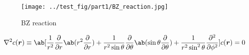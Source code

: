 \documentclass[autodetect-engine,dvipdfmx-if-dvi,a4paper,ja=standard]{bxjsbook}
\begin{document}
\begin{figure}
  \centering
  \texttt{[image: ../test\_fig/part1/BZ\_reaction.jpg]}
  \caption{BZ reaction}
  \label{fig:BZ}
\end{figure}

\begin{equation}
  \nabla^2c(\bm{r})\equiv \ab[\frac{1}{r^2}\pdv*{\ab(r^2\pdv{}{r})}{r}+\frac{1}{r^2\sin\theta}\pdv*{\ab(\sin\theta\pdv{}{\theta})}{\theta}+\frac{1}{r^2\sin^2\theta}\pdv[2]{}{\phi}]c(\bm{r})=0
  \label{eq:laplace}
\end{equation}
%   
%   
\end{document}
